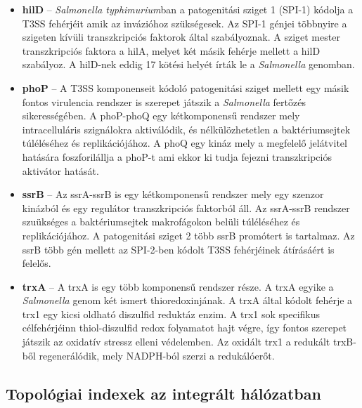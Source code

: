 \documentclass[a4paper,12pt]{article}
\begin{document}
			\begin{itemize}
				\item \textbf{hilD} -- \textit{Salmonella typhimurium}ban a patogenitási sziget 1 (SPI-1) kódolja a T3SS fehérjéit amik az invázióhoz szükségesek. Az SPI-1 génjei többnyire a szigeten kívüli transzkripciós faktorok által szabályoznak. A sziget mester transzkripciós faktora a hilA, melyet két másik fehérje mellett a hilD szabályoz. A hilD-nek eddig 17 kötési helyét írták le a \textit{Salmonella} genomban. \cite{hilD}

				\item \textbf{phoP} -- A T3SS komponenseit kódoló patogenitási sziget mellett egy másik fontos virulencia rendszer is szerepet játszik a \textit{Salmonella} fertőzés sikerességében. 
				A phoP-phoQ egy kétkomponensű rendszer mely intracelluláris szignálokra aktiválódik, és nélkülözhetetlen a baktériumsejtek túléléséhez és replikációjához. A phoQ egy kináz mely a megfelelő jelátvitel hatására foszforilállja a phoP-t ami ekkor ki tudja fejezni transzkripciós aktivátor hatását. \cite{phoP}
				
				\item \textbf{ssrB} -- Az ssrA-ssrB is egy kétkomponensű rendszer mely egy szenzor kinázból és egy regulátor transzkripciós faktorból áll. Az ssrA-ssrB rendszer szuükséges a baktériumsejtek makrofágokon belüli túléléséhez és replikációjához. A patogenitási sziget 2 több ssrB promótert is tartalmaz. Az ssrB több gén mellett az SPI-2-ben kódolt T3SS fehérjéinek átírásáért is felelős. \cite{ssrB}
				
				\item \textbf{trxA} -- A trxA is egy több komponensű rendszer része. A trxA egyike a \textit{Salmonella} genom két ismert thioredoxinjának. A trxA által kódolt fehérje a trx1 egy kicsi oldható diszulfid reduktáz enzim.  A trx1 sok specifikus célfehérjéinn thiol-diszulfid redox folyamatot hajt végre, így fontos szerepet játszik az oxidatív stressz elleni védelemben. Az oxidált trx1 a redukált trxB-ből regenerálódik, mely NADPH-ból szerzi a redukálóerőt. \cite{trxA}
			\end{itemize}
			
	\subsection{Topológiai indexek az integrált hálózatban}
			
\end{document}
